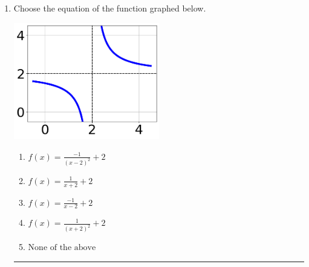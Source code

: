 \documentclass[14pt]{extbook}
\newcommand{\litem}[1]{\item#1\hspace*{-1cm}\rule{\textwidth}{0.4pt}}
\begin{document}
\begin{enumerate}
{\begin{enumerate}[label=\Alph*.]
\end{enumerate} }
\litem{
Choose the equation of the function graphed below.
\begin{center}
    \includegraphics[width=0.5\textwidth]{../Figures/rationalGraphToEquationCopyB.png}
\end{center}
\begin{enumerate}[label=\Alph*.]
\item \( f(x) = \frac{-1}{(x - 2)^2} + 2 \)
\item \( f(x) = \frac{1}{x + 2} + 2 \)
\item \( f(x) = \frac{-1}{x - 2} + 2 \)
\item \( f(x) = \frac{1}{(x + 2)^2} + 2 \)
\item \( \text{None of the above} \)


\end{enumerate}}
\end{enumerate}
\end{document}
